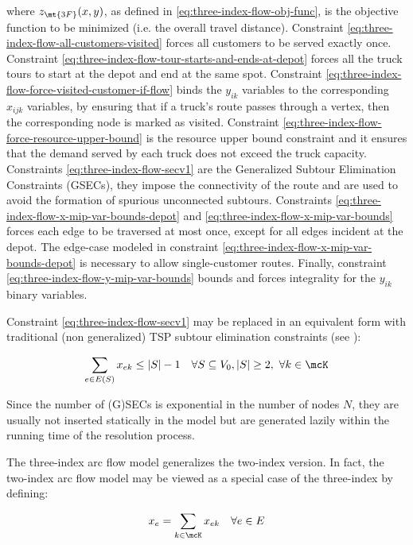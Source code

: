 where $z_\mt{3F}(x, y)$, as defined in \eqref{eq:three-index-flow-obj-func}, is the objective function to be minimized (i.e. the overall travel distance).
Constraint \eqref{eq:three-index-flow-all-customers-visited} forces all customers to be served exactly once.
Constraint \eqref{eq:three-index-flow-tour-starts-and-ends-at-depot} forces all the truck tours to start at the depot and end at the same spot.
Constraint \eqref{eq:three-index-flow-force-visited-customer-if-flow} binds the $y_{ik}$ variables to the corresponding $x_{ijk}$ variables, by ensuring that if a truck's route passes through a vertex, then the corresponding node is marked as visited.
Constraint \eqref{eq:three-index-flow-force-resource-upper-bound} is the resource upper bound constraint and it ensures that the demand served by each truck does not exceed the truck capacity.
Constraints \eqref{eq:three-index-flow-secv1} are the Generalized Subtour Elimination Constraints (GSECs), they impose the connectivity of the route and are used to avoid the formation of spurious unconnected subtours.
Constraints \eqref{eq:three-index-flow-x-mip-var-bounds-depot} and \eqref{eq:three-index-flow-x-mip-var-bounds} forces each edge to be traversed at most once,
except for all edges incident at the depot.
The edge-case modeled in constraint \eqref{eq:three-index-flow-x-mip-var-bounds-depot} is necessary to allow single-customer routes.
Finally, constraint \eqref{eq:three-index-flow-y-mip-var-bounds} bounds and forces integrality for the $y_{ik}$ binary variables.

Constraint \eqref{eq:three-index-flow-secv1} may be replaced in an equivalent form with traditional (non generalized) TSP subtour elimination constraints (see \textcite{fisher1981}):

\begin{equation}\label{eq:three-index-flow-secv2}
	\sum_{e \in E(S)} x_{ek} \le |S| - 1 \quad \forall S \subseteq V_0, |S| \ge 2,\ \forall k \in \mcK
\end{equation}

Since the number of (G)SECs is exponential in the number of nodes $N$, they are usually not inserted statically in the model but are generated lazily within the running time of the resolution process.

The three-index arc flow model generalizes the two-index version.
In fact, the two-index arc flow model may be viewed as a special case of the three-index by defining:


\begin{equation}
	x_e = \sum_{k \in \mcK} x_{ek} \quad \forall e \in E
\end{equation}


